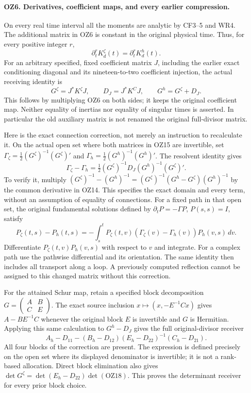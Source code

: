 \paragraph{OZ6. Derivatives, coefficient maps, and every earlier compression.}
On every real time interval all the moments are analytic by
CF3--5 and WR4. The additional matrix in OZ6 is constant in the
original physical time. Thus, for every positive integer \(r\),
\[
 \partial_t^rK^\zeta_d(t)=\partial_t^rK^h_d(t).
                                                               \tag{OZ14}
\]
For an arbitrary specified, fixed coefficient matrix \(J\),
including the earlier exact conditioning diagonal and its
nineteen-to-two coefficient injection, the actual receiving
identity is
\[
 G^\zeta=J^*K^\zeta J,\qquad
 D_J=J^*K^CJ,\qquad
 G^h=G^\zeta+D_J.                                \tag{OZ15}
\]
This follows by multiplying OZ6 on both sides; it keeps the
original coefficient map. Neither equality of inertias nor
equality of singular times is asserted. In particular the old
auxiliary matrix is not renamed the original full-divisor matrix.

Here is the exact connection correction, not merely an instruction
to recalculate it. On the actual open set where both matrices in
OZ15 are invertible, set
\(\Gamma_\zeta=\tfrac12(G^\zeta)^{-1}(G^\zeta)'\) and
\(\Gamma_h=\tfrac12(G^h)^{-1}(G^h)'\). The resolvent identity
gives
\[
 \Gamma_\zeta-\Gamma_h
  =\tfrac12(G^\zeta)^{-1}D_J(G^h)^{-1}(G^\zeta)' .
                                                               \tag{OZ16}
\]
To verify it, multiply
\((G^\zeta)^{-1}-(G^h)^{-1}
 =(G^\zeta)^{-1}(G^h-G^\zeta)(G^h)^{-1}\)
by the common derivative in OZ14. This specifies the exact domain
and every term, without an assumption of equality of connections.
For a fixed path in that open set, the original fundamental
solutions defined by \(\partial_tP=-\Gamma P\), \(P(s,s)=I\),
satisfy
\[
 P_\zeta(t,s)-P_h(t,s)
 =-\int_s^t P_\zeta(t,v)
       (\Gamma_\zeta(v)-\Gamma_h(v))P_h(v,s)\,dv.  \tag{OZ17}
\]
Differentiate \(P_\zeta(t,v)P_h(v,s)\) with respect to \(v\)
and integrate. For a complex path use the pathwise differential
and its orientation. The same identity then includes all
transport along a loop. A previously computed reflection cannot
be assigned to this changed matrix without this correction.

For the attained Schur map, retain a specified block decomposition
\(G=\left(\begin{smallmatrix}A&B\\C&E\end{smallmatrix}\right)\).
The exact source inclusion \(x\mapsto(x,-E^{-1}Cx)\) gives
\(A-BE^{-1}C\) whenever the original block \(E\) is invertible
and \(G\) is Hermitian. Applying this same calculation to
\(G^h-D_J\) gives the full original-divisor receiver
\[
 A_h-D_{11}-(B_h-D_{12})(E_h-D_{22})^{-1}(C_h-D_{21}).
                                                               \tag{OZ18}
\]
All four blocks of the correction are present. The expression is
defined precisely on the open set where its displayed denominator
is invertible; it is not a rank-based allocation. Direct block
elimination also gives
\(\det G^\zeta=\det(E_h-D_{22})\det(\text{OZ18})\).
This proves the determinant receiver for every prior block choice.

